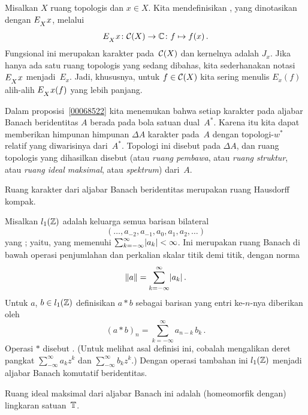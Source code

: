 \begin{exam}\label{00068524} Misalkan $X$ ruang topologis dan $x \in X$. Kita mendefinisikan
, yang dinotasikan dengan $E_{{}_{\scriptstyle{X}}}x$, melalui
   \[ E_{{}_{\scriptstyle{X}}}x\colon \mathcal{C}(X) \rightarrow \mathbb{C}\colon f \mapsto f(x)\,. \]
Fungsional ini merupakan karakter pada~$\mathcal{C}(X)$ dan kernelnya adalah $J_x$. Jika hanya ada
satu ruang topologis yang sedang dibahas, kita sederhanakan notasi $E_{{}_{\scriptstyle{X}}}x$ menjadi~$E_x$.
Jadi, khususnya, untuk $f \in \mathcal{C}(X)$ kita sering menulis $E_x(f)$ alih-alih
$E_{{}_{\scriptstyle{X}}}x(f)$ yang lebih panjang.
\end{exam}

\begin{defn} Dalam proposisi~\ref{00068522} kita menemukan bahwa setiap karakter pada aljabar Banach
beridentitas $A$ berada pada bola satuan dual~$A^*$. Karena itu kita dapat memberikan himpunan
himpunan $\Delta A$ karakter pada~$A$ dengan topologi-$w^*$ relatif yang diwarisinya
dari~$A^*$. Topologi ini disebut
 pada $\Delta A$, dan ruang topologis yang dihasilkan disebut
 (atau \emph{ruang pembawa}, atau \emph{ruang struktur}, atau \emph{ruang ideal maksimal}, atau \emph{spektrum}) dari~$A$.
\end{defn}

\begin{prop} Ruang karakter dari aljabar Banach beridentitas merupakan ruang Hausdorff kompak.
\end{prop}

\begin{exam}\label{000633} Misalkan $l_1(\mathbb{Z})$ adalah keluarga semua barisan bilateral
   \[ (\dots,a_{-2},a_{-1},a_0,a_1,a_2,\dots) \]
yang
; yaitu, yang memenuhi $\sum_{k=-\infty}^{\infty} \lvert a_k\rvert <
\infty$. Ini merupakan ruang Banach di bawah operasi penjumlahan dan perkalian skalar titik demi titik,
dengan norma
   \[ \lVert a\rVert = \sum_{k=-\infty}^{\infty} \lvert a_k\rvert\,. \]
Untuk $a$, $b \in l_1(\mathbb{Z})$ definisikan $a \ast b$ sebagai barisan yang entri ke-$n$-nya
diberikan oleh
  \[ (a \ast b)_n = \sum_{k=-\infty}^{\infty} a_{n-k}\,b_k\,. \]
Operasi $\ast$ disebut
. (Untuk melihat asal definisi ini, cobalah mengalikan deret pangkat
$\sum_{-\infty}^{\infty}a_kz^k$ dan $\sum_{-\infty}^{\infty}b_kz^k$.) Dengan operasi tambahan ini
$l_1(\mathbb{Z})$ menjadi aljabar Banach komutatif beridentitas.

Ruang ideal maksimal dari aljabar Banach ini
adalah (homeomorfik dengan) lingkaran satuan~$\mathbb{T}$.
\end{exam}

